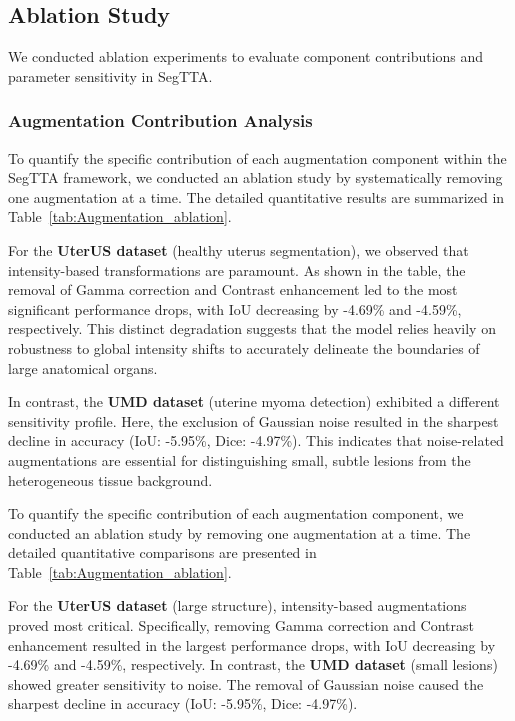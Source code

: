 \documentclass{article}
\newcommand{\uterusRmGammaIoU}{-4.69}
\newcommand{\uterusRmContrastIoU}{-4.59}
\newcommand{\umdRmNoiseIoU}{-5.95}
\newcommand{\umdRmNoiseDice}{-4.97}
\begin{document}
\subsection{Ablation Study}

We conducted ablation experiments to evaluate component contributions and parameter sensitivity in SegTTA.

\subsubsection{Augmentation Contribution Analysis}

To quantify the specific contribution of each augmentation component within the SegTTA framework, we conducted an ablation study by systematically removing one augmentation at a time. The detailed quantitative results are summarized in Table~\ref{tab:Augmentation_ablation}.

For the \textbf{UterUS dataset} (healthy uterus segmentation), we observed that intensity-based transformations are paramount. As shown in the table, the removal of Gamma correction and Contrast enhancement led to the most significant performance drops, with IoU decreasing by \uterusRmGammaIoU\% and \uterusRmContrastIoU\%, respectively. This distinct degradation suggests that the model relies heavily on robustness to global intensity shifts to accurately delineate the boundaries of large anatomical organs.

In contrast, the \textbf{UMD dataset} (uterine myoma detection) exhibited a different sensitivity profile. Here, the exclusion of Gaussian noise resulted in the sharpest decline in accuracy (IoU: \umdRmNoiseIoU\%, Dice: \umdRmNoiseDice\%). This indicates that noise-related augmentations are essential for distinguishing small, subtle lesions from the heterogeneous tissue background.

To quantify the specific contribution of each augmentation component, we conducted an ablation study by removing one augmentation at a time. The detailed quantitative comparisons are presented in Table~\ref{tab:Augmentation_ablation}.

For the \textbf{UterUS dataset} (large structure), intensity-based augmentations proved most critical. Specifically, removing Gamma correction and Contrast enhancement resulted in the largest performance drops, with IoU decreasing by \uterusRmGammaIoU\% and \uterusRmContrastIoU\%, respectively. 
In contrast, the \textbf{UMD dataset} (small lesions) showed greater sensitivity to noise. The removal of Gaussian noise caused the sharpest decline in accuracy (IoU: \umdRmNoiseIoU\%, Dice: \umdRmNoiseDice\%).
\end{document}
